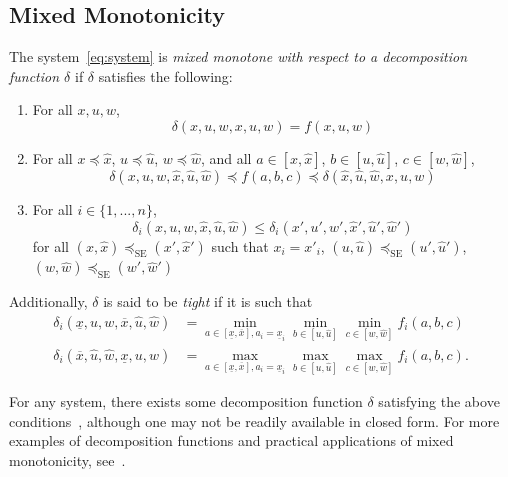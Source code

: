 \documentclass[preprint,12pt]{elsarticle}
\newcommand{\ul}{\underline}
\newcommand{\ol}{\overline}
\begin{document}
\subsection{Mixed Monotonicity}
The system~\eqref{eq:system} is \emph{mixed monotone with respect to a decomposition function $\delta$} if $\delta$ satisfies the following:
\begin{enumerate}
    \item For all $x, u, w$, 
    \begin{equation}
        \delta (x, u, w, x, u, w) = f(x, u, w)
    \end{equation}
    \item For all $x \preceq \widehat{x}$, $u \preceq \widehat{u}$, $w \preceq \widehat{w}$, and all $a \in [x, \widehat{x}]$, $b \in [u, \widehat{u}]$, $c \in [w, \widehat{w}]$,
    \begin{equation}
        \delta (x, u, w, \widehat{x}, \widehat{u}, \widehat{w}) \preceq f(a, b, c) \preceq \delta ( \widehat{x}, \widehat{u},\widehat{w}, x, u, w)
    \end{equation}
    \item For all $i\in \{1,...,n\}$,
    \begin{equation}
         \delta_i (x, u, w, \widehat{x}, \widehat{u}, \widehat{w})\leq\delta_i (x', u', w', \widehat{x}', \widehat{u}', \widehat{w}')
    \end{equation}
    for all $(x, \widehat{x})\preceq_\text{SE}(x', \widehat{x}')$ such that $x_i = x'_i$, $(u, \widehat{u})\preceq_\text{SE}(u', \widehat{u}')$, $(w, \widehat{w})\preceq_\text{SE}(w', \widehat{w}')$
\end{enumerate}
Additionally, $\delta$ is said to be \emph{tight} if it is such that
\begin{align}
    \delta_i(\ul{x}, u, w, \ol{x}, \widehat{u}, \widehat{w}) &= \min_{a \in [\ul{x}, \ol{x}], a_i = \ul{x}_i}\min_{b \in [u, \widehat{u}]}\min_{c \in [w, \widehat{w}]} f_i(a, b, c) \label{eq:tight1}\\
    \delta_i(\ol{x}, \widehat{u}, \widehat{w}, \ul{x}, u, w) &= \max_{a \in [\ul{x}, \ol{x}], a_i = \ul{x}_i}\max_{b \in [u, \widehat{u}]}\max_{c \in [w, \widehat{w}]} f_i(a, b, c).\label{eq:tight2}
\end{align}

For any system, there exists some decomposition function $\delta$ satisfying the above conditions~\cite{abateTight}, although one may not be readily available in closed form. For more examples of decomposition functions and practical applications of mixed monotonicity, see~\cite{caoMMGPsMPC, abateSpaceCraft}.
\end{document}
